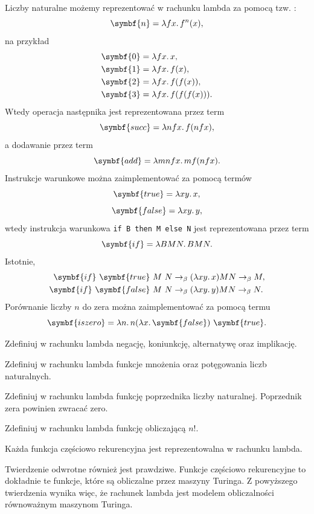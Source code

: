 \documentclass[polish,pretty,bibliography=totocnumbered]{angav}
\begin{document}
Liczby naturalne możemy reprezentować w rachunku lambda za pomocą tzw. :
\[ \symbf{n} = \lambda fx\ldotp f^n(x), \]
na przykład
\begin{align*}
    \symbf{0} &= \lambda fx\ldotp x, \\
    \symbf{1} &= \lambda fx\ldotp f(x), \\
    \symbf{2} &= \lambda fx\ldotp f(f(x)), \\
    \symbf{3} &= \lambda fx\ldotp f(f(f(x))).
\end{align*}
Wtedy operacja następnika jest reprezentowana przez term
\[ \symbf{succ} = \lambda nfx\ldotp f(nfx), \]
a dodawanie przez term
\[ \symbf{add} = \lambda mnfx\ldotp mf(nfx). \]
Instrukcje warunkowe można zaimplementować za pomocą termów
\[ \symbf{true} = \lambda xy\ldotp x, \]
\[ \symbf{false} = \lambda xy\ldotp y, \]
wtedy instrukcja warunkowa \texttt{if B then M else N} jest reprezentowana przez term
\[ \symbf{if} = \lambda B M N\ldotp B M N. \]
Istotnie,
\begin{align*}
    \symbf{if}\ \symbf{true}\ M\ N &\to_\beta (\lambda xy\ldotp x) M N \to_\beta M, \\
    \symbf{if}\ \symbf{false}\ M\ N &\to_\beta (\lambda xy\ldotp y) M N \to_\beta N.
\end{align*}
Porównanie liczby $n$ do zera można zaimplementować za pomocą termu
\[ \symbf{iszero} = \lambda n\ldotp n (\lambda x\ldotp \symbf{false})\ \symbf{true}. \]

\begin{problem}
    Zdefiniuj w rachunku lambda negację, koniunkcję, alternatywę oraz implikację.
\end{problem}

\begin{problem}
    Zdefiniuj w rachunku lambda funkcje mnożenia oraz potęgowania liczb naturalnych.
\end{problem}

\begin{problem}
    Zdefiniuj w rachunku lambda funkcję poprzednika liczby naturalnej. Poprzednik zera powinien zwracać zero.
\end{problem}

\begin{problem}
    Zdefiniuj w rachunku lambda funkcję obliczającą $n!$.
\end{problem}

\begin{theorem}[Kleene'a]
    Każda funkcja częściowo rekurencyjna jest reprezentowalna w rachunku lambda.
\end{theorem}
Twierdzenie odwrotne również jest prawdziwe. Funkcje częściowo rekurencyjne to dokładnie te funkcje, które są obliczalne przez maszyny Turinga. Z powyższego twierdzenia wynika więc, że rachunek lambda jest modelem obliczalności równoważnym maszynom Turinga.
\end{document}
